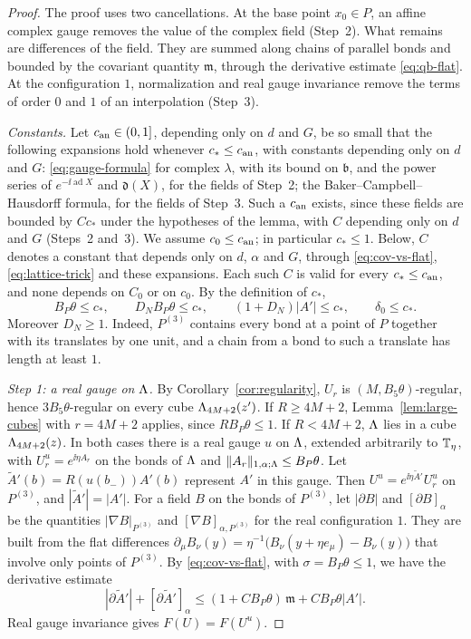 \begin{proof}
The proof uses two cancellations. At the base point $x_0\in P$, an affine complex gauge removes the value of the complex field (Step~2). What remains are differences of the field. They are summed along chains of parallel bonds and bounded by the covariant quantity $\mathfrak m$, through the derivative estimate \eqref{eq:qb-flat}. At the configuration $1$, normalization and real gauge invariance remove the terms of order $0$ and $1$ of an interpolation (Step~3).

\emph{Constants.} Let $c_{\rm an}\in(0,1]$, depending only on $d$ and $G$, be so small that the following expansions hold whenever $c_*\le c_{\rm an}$, with constants depending only on $d$ and $G$: \eqref{eq:gauge-formula} for complex $\lambda$, with its bound on $\mathfrak b$, and the power series of $e^{-\ii\operatorname{ad}X}$ and $\mathfrak d(X)$, for the fields of Step~2; the Baker--Campbell--Hausdorff formula, for the fields of Step~3. Such a $c_{\rm an}$ exists, since these fields are bounded by $Cc_*$ under the hypotheses of the lemma, with $C$ depending only on $d$ and $G$ (Steps~2 and~3). We assume $c_0\le c_{\rm an}$; in particular $c_*\le1$. Below, $C$ denotes a constant that depends only on $d$, $\alpha$ and $G$, through \eqref{eq:cov-vs-flat}, \eqref{eq:lattice-trick} and these expansions. Each such $C$ is valid for every $c_*\le c_{\rm an}$, and none depends on $C_0$ or on $c_0$. By the definition of $c_*$,
\[
B_P\theta\le c_*,\qquad D_NB_P\theta\le c_*,\qquad(1+D_N)|A'|\le c_*,\qquad\delta_0\le c_* .
\]
Moreover $D_N\ge1$. Indeed, $P^{(3)}$ contains every bond at a point of $P$ together with its translates by one unit, and a chain from a bond to such a translate has length at least $1$.

\emph{Step 1: a real gauge on $\Lambda$.} By Corollary~\ref{cor:regularity}, $U_r$ is $(M,B_5\theta)$-regular, hence $3B_5\theta$-regular on every cube $\Lambda_{4M+2}(z')$. If $R\ge4M+2$, Lemma~\ref{lem:large-cubes} with $r=4M+2$ applies, since $RB_P\theta\le1$. If $R<4M+2$, $\Lambda$ lies in a cube $\Lambda_{4M+2}(z)$. In both cases there is a real gauge $u$ on $\Lambda$, extended arbitrarily to $\mathbb T_\eta$, with $U_r^u=e^{\ii\eta A_r}$ on the bonds of $\Lambda$ and $\|A_r\|_{1,\alpha;\Lambda}\le B_P\theta$. Let $\tilde A'(b)=R(u(b_-))A'(b)$ represent $A'$ in this gauge. Then $U^u=e^{\ii\eta\tilde A'}U_r^u$ on $P^{(3)}$, and $|\tilde A'|=|A'|$. For a field $B$ on the bonds of $P^{(3)}$, let $|\partial B|$ and $[\partial B]_\alpha$ be the quantities $|\nabla B|_{P^{(3)}}$ and $[\nabla B]_{\alpha,P^{(3)}}$ for the real configuration $1$. They are built from the flat differences $\partial_\mu B_\nu(y)=\eta^{-1}\big(B_\nu(y+\eta e_\mu)-B_\nu(y)\big)$ that involve only points of $P^{(3)}$. By \eqref{eq:cov-vs-flat}, with $\sigma=B_P\theta\le1$, we have the derivative estimate
\begin{equation}\label{eq:qb-flat}
|\partial\tilde A'|+[\partial\tilde A']_\alpha\le(1+CB_P\theta)\,\mathfrak m+CB_P\theta|A'| .
\end{equation}
Real gauge invariance gives $F(U)=F(U^u)$.


\end{proof}
